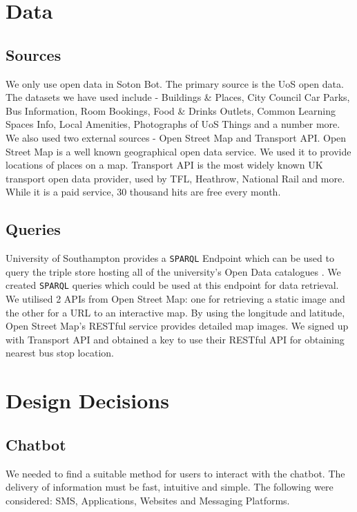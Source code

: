 \documentclass[journal, a4paper]{IEEEtran}
\begin{document}
\section{Data} 
\label{data}

\subsection{Sources}

We only use open data in Soton Bot. The primary source is the UoS open data. The datasets we have used include - Buildings \& Places, City Council Car Parks, Bus Information, Room Bookings, Food \& Drinks Outlets, Common Learning Spaces Info, Local Amenities, Photographs of UoS Things and a number more.\\

We also used two external sources - Open Street Map and Transport API. Open Street Map is a well known geographical open data service. We used it to provide locations of places on a map. Transport API is the most widely known UK transport open data provider, used by TFL, Heathrow, National Rail and more. While it is a paid service, 30 thousand hits are free every month. 

\subsection{Queries}

University of Southampton provides a \texttt{SPARQL} Endpoint \cite{sparql_endpoint} which can be used to query the triple store hosting all of the university's Open Data catalogues \cite{data_catalog}. We created \texttt{SPARQL} queries which could be used at this endpoint for data retrieval.\\

We utilised 2 APIs from Open Street Map: one for retrieving a static image and the other for a URL to an interactive map. By using the longitude and latitude, Open Street Map's RESTful service provides detailed map images. We signed up with Transport API and obtained a key to use their RESTful API for obtaining nearest bus stop location. 

\section{Design Decisions}
\subsection{Chatbot}
We needed to find a suitable method for users to interact with the chatbot. The delivery of information must be fast, intuitive and simple. The following were considered: SMS, Applications, Websites and Messaging Platforms.\\
\end{document}
